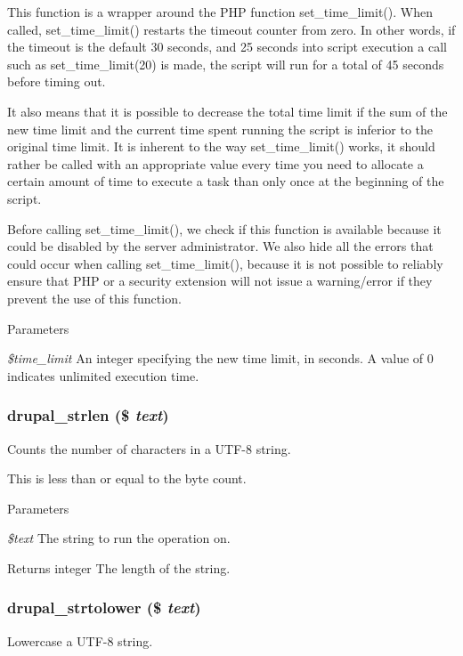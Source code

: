 This function is a wrapper around the PHP function set\_\-time\_\-limit(). When called, set\_\-time\_\-limit() restarts the timeout counter from zero. In other words, if the timeout is the default 30 seconds, and 25 seconds into script execution a call such as set\_\-time\_\-limit(20) is made, the script will run for a total of 45 seconds before timing out.

It also means that it is possible to decrease the total time limit if the sum of the new time limit and the current time spent running the script is inferior to the original time limit. It is inherent to the way set\_\-time\_\-limit() works, it should rather be called with an appropriate value every time you need to allocate a certain amount of time to execute a task than only once at the beginning of the script.

Before calling set\_\-time\_\-limit(), we check if this function is available because it could be disabled by the server administrator. We also hide all the errors that could occur when calling set\_\-time\_\-limit(), because it is not possible to reliably ensure that PHP or a security extension will not issue a warning/error if they prevent the use of this function.


\begin{DoxyParams}{Parameters}
\item[{\em \$time\_\-limit}]An integer specifying the new time limit, in seconds. A value of 0 indicates unlimited execution time. \end{DoxyParams}
\hypertarget{group__php__wrappers_gae8a4670a2f9b1c67d02259a49ee3ec7e}{
\subsubsection[{drupal\_\-strlen}]{\setlength{\rightskip}{0pt plus 5cm}drupal\_\-strlen (\$ {\em text})}}
\label{group__php__wrappers_gae8a4670a2f9b1c67d02259a49ee3ec7e}
Counts the number of characters in a UTF-\/8 string.

This is less than or equal to the byte count.


\begin{DoxyParams}{Parameters}
\item[{\em \$text}]The string to run the operation on.\end{DoxyParams}
\begin{DoxyReturn}{Returns}
integer The length of the string. 
\end{DoxyReturn}
\hypertarget{group__php__wrappers_gad97b9d0b7d26db7c62671e9ddce98f8f}{
\subsubsection[{drupal\_\-strtolower}]{\setlength{\rightskip}{0pt plus 5cm}drupal\_\-strtolower (\$ {\em text})}}
\label{group__php__wrappers_gad97b9d0b7d26db7c62671e9ddce98f8f}
Lowercase a UTF-\/8 string.


